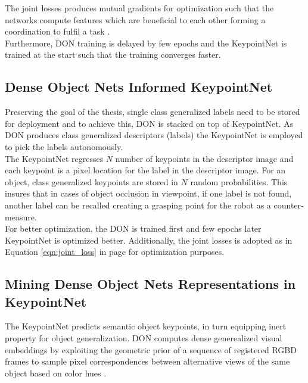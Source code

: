 The joint losses produces mutual gradients for optimization such that the networks compute features which are beneficial to each other forming a coordination
to fulfil a task \cite{levine2016end}.\\

Furthermore, \ac{DON} training is delayed by few epochs and the KeypointNet is trained at the start such that the training converges faster.


\subsection{Dense Object Nets Informed KeypointNet}
\label{section: DON-KeypointNet}

Preserving the goal of the thesis, single class generalized labels need to be stored for deployment and to achieve this, \ac{DON} is stacked on top of KeypointNet.
As \ac{DON} produces class generalized descriptors (labels) the KeypointNet is employed to pick the labels autonomously.\\

The KeypointNet regresses $N$ number of keypoints in the descriptor image and each keypoint is a pixel location for the label in the descriptor image.
For an object, class generalized keypoints are stored in $N$ random probabilities. This insures that in cases of object occlusion in viewpoint, if one label is not found, another label can be recalled
creating a grasping point for the robot as a counter-measure.\\

For better optimization, the \ac{DON} is trained first and few epochs later KeypointNet is optimized better.
Additionally, the joint losses is adopted as in Equation \ref{eqn:joint_loss} in page \pageref{eqn:joint_loss} for optimization purposes.




\subsection{Mining Dense Object Nets Representations in KeypointNet}

The KeypointNet predicts semantic object keypoints, in turn equipping inert property for object generalization. \ac{DON} computes dense
generealized visual embeddings by exploiting the geometric prior of a sequence of registered RGBD frames to sample pixel correspondences
between alternative views of the same object based on color hues \cite{adrian2022efficient}.\\

